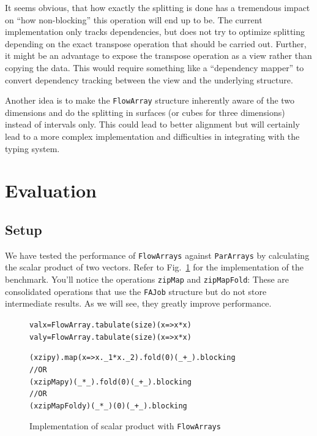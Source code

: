 \documentclass[runningheads,a4paper,fleqn]{llncs}
\begin{document}
It seems obvious, that how exactly the splitting is done has a
tremendous 
impact on ``how non-blocking'' this operation will end up to be. The
current implementation only tracks dependencies, but does not try to
optimize splitting depending on the exact transpose operation that
should be carried out. Further, it might be an advantage to expose the
transpose operation as a view rather than copying the data. This would
require something like a ``dependency mapper'' to convert dependency
tracking between the view and the underlying structure.

Another idea is to make the \texttt{FlowArray} structure inherently aware of
the two dimensions and do the splitting in surfaces (or cubes for
three dimensions) instead of intervals only. This could lead to better
alignment but will certainly lead to a more complex implementation and
difficulties in integrating with the typing system.

\section{Evaluation}
\label{sec:evaluation}

\subsection{Setup}

We have tested the performance of \texttt{FlowArrays} against
\texttt{ParArrays} by calculating the scalar product of two vectors. Refer to
Fig.~\ref{fig:scalar-product} for the implementation of the
benchmark. You'll notice the operations \texttt{zipMap} and
\texttt{zipMapFold}: These are consolidated operations that use the
\texttt{FAJob} structure but do not store intermediate results. As we
will see, they greatly improve performance.


\begin{figure}
\begin{minipage}[t]{6cm}
\begin{alltt}
{\scriptsize
val x = FlowArray.tabulate(size)(x => x*x)
val y = FlowArray.tabulate(size)(x => x*x)

(x zip y).map(x => x._1 * x._2).fold(0)(_ + _).blocking
// OR
(x zipMap y)(_ * _).fold(0)(_ + _).blocking
// OR
(x zipMapFold y)(_ * _)(0)(_ + _).blocking
}
\end{alltt}
\end{minipage}
\caption{Implementation of scalar product with \texttt{FlowArrays}}
\label{fig:scalar-product}
\end{figure}
\end{document}
